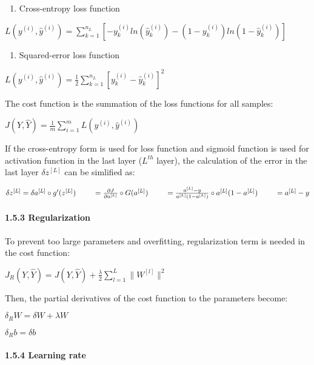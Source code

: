 \documentclass[11pt]{article}
\providecommand{\tightlist}{%
      \setlength{\itemsep}{0pt}\setlength{\parskip}{0pt}}
\begin{document}
\begin{enumerate}
\def\labelenumi{\alph{enumi})}
\tightlist
\item
  Cross-entropy loss function
\end{enumerate}

\(L(y^{(i)}, \hat{y}^{(i)}) = \sum^{n_{L}}_{k=1} [-y^{(i)}_k ln(\hat{y}^{(i)}_k) - (1-y^{(i)}_k) ln(1 - \hat{y}^{(i)}_k) ]\)

\begin{enumerate}
\def\labelenumi{\alph{enumi})}
\setcounter{enumi}{1}
\tightlist
\item
  Squared-error loss function
\end{enumerate}

\(L(y^{(i)}, \hat{y}^{(i)}) = \frac{1}{2} \sum^{n_{L}}_{k=1} [y^{(i)}_k - \hat{y}^{(i)}_k]^2\)

The cost function is the summation of the loss functions for all
samples:

\(J(Y, \hat{Y}) = \frac{1}{m} \sum^{m}_{i=1} L(y^{(i)}, \hat{y}^{(i)})\)

If the cross-entropy form is used for loss function and sigmoid function
is used for activation function in the last layer (\(L^{th}\) layer),
the calculation of the error in the last layer \(\delta z^{[L]}\) can be
simlified as:

\(\delta z^{[L]} = \delta a^{[L]} \circ g'(z^{[L]}) \\ \ \ \ \ \ \ \ = \frac{\partial J}{\partial a^{[L]}} \circ G(a^{[L]}) \\ \ \ \ \ \ \ \ = \frac{a^{[L]}-y}{a^{[L]}(1-a^{[L]})} \circ a^{[L]}(1-a^{[L]}) \\ \ \ \ \ \ \ \ = a^{[L]} - y\)

\paragraph{1.5.3 Regularization}\label{regularization}

To prevent too large parameters and overfitting, regularization term is
needed in the cost function:

\(J_{R}(Y, \hat{Y}) = J(Y, \hat{Y}) + \frac{\lambda}{2} \sum_{l=1}^{L} \parallel W^{[l]} \parallel ^ 2\)

Then, the partial derivatives of the cost function to the parameters
become:

\(\delta_R W = \delta W + \lambda W\)

\(\delta_R b = \delta b\)

\paragraph{1.5.4 Learning rate}\label{learning-rate}
\end{document}
